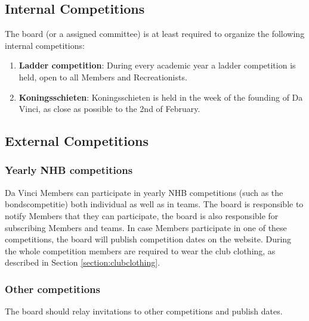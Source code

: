 \documentclass[a4paper]{article}
\begin{document}
\subsection{Internal Competitions}
The board (or a assigned committee) is at least required to organize the following internal competitions: \\
\begin{enumerate}
\item \textbf{Ladder competition}: During every academic year a ladder competition is held, open to all { Members} and { Recreationists}.
\item \textbf{Koningsschieten}: Koningsschieten is held in the week of the founding of Da Vinci, as close as possible to the 2nd of February.
\end{enumerate}

\subsection{External Competitions}
\subsubsection{Yearly NHB competitions}
Da Vinci { Members} can participate in yearly { NHB} competitions (such as the bondscompetitie) both individual as well as in teams. The board is responsible to notify { Members} that they can participate, the board is also responsible for subscribing { Members} and teams. In case { Members} participate in one of these competitions, the board will publish competition dates on the website. During the whole competition members are required to wear the club clothing, as described in Section \ref{section:clubclothing}.

\subsubsection{Other competitions}
The board should relay invitations to other competitions and publish dates.
\end{document}
